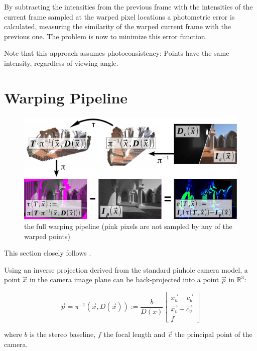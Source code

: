 By subtracting the intensities from the previous frame with the
intensities of the current frame sampled at the warped pixel locations a
photometric error is calculated, measuring the similarity of the warped current
frame with the previous one. The problem is now to minimize this error function.

Note that this approach assumes photoconsistency: Points have the same
intensity, regardless of viewing angle.


\section{Warping Pipeline}

\begin{figure}[h]
    \centering
    \includegraphics[width=\textwidth]{images/warp_pipeline.pdf}
    \caption{the full warping pipeline (pink pixels are not sampled by any of the warped points)}
    \label{fig:warp_pipeline}
\end{figure}

This section closely follows \cite{omaridenseodometry}.

Using an inverse projection derived from the standard pinhole camera model, a
point $ \vec{x} $ in the camera image plane can be back-projected into a point
$ \vec{p} $ in $ \mathbb{R}^3 $:

\begin{equation}
    \label{eq:backprojection}
    \vec{p} = \pi^{-1}(\vec{x}, D(\vec{x})) := \frac{b}{D(x)}
    \begin{bmatrix}
        \vec{x_u} - \vec{c_u} \\
        \vec{x_v} - \vec{c_v} \\
        f
    \end{bmatrix}
\end{equation}

where $b$ is the stereo baseline, $f$ the focal length and $\vec{c}$ the principal point of the camera.


